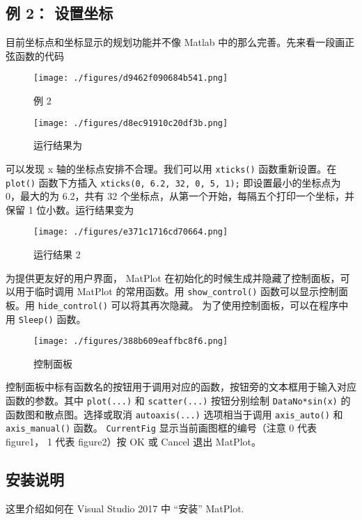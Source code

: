 \subsection{例 2： 设置坐标}

目前坐标点和坐标显示的规划功能并不像 Matlab 中的那么完善。先来看一段画正弦函数的代码

\begin{figure}[ht]
\centering
\texttt{[image: ./figures/d9462f090684b541.png]}
\caption{例 2} \label{fig_MtPlot_5}
\end{figure}

\begin{figure}[ht]
\centering
\texttt{[image: ./figures/d8ec91910c20df3b.png]}
\caption{运行结果为} \label{fig_MtPlot_6}
\end{figure}

可以发现 x 轴的坐标点安排不合理。我们可以用 \verb`xticks()` 函数重新设置。在 \verb`plot()` 函数下方插入
\verb`xticks(0, 6.2, 32, 0, 5, 1);`
即设置最小的坐标点为 0，最大的为 6.2，共有 32 个坐标点，从第一个开始，每隔五个打印一个坐标，并保留 1 位小数。运行结果变为

\begin{figure}[ht]
\centering
\texttt{[image: ./figures/e371c1716cd70664.png]}
\caption{运行结果 2} \label{fig_MtPlot_7}
\end{figure}

为提供更友好的用户界面， MatPlot 在初始化的时候生成并隐藏了控制面板，可以用于临时调用 MatPlot 的常用函数。用 \verb`show_control()` 函数可以显示控制面板。用 \verb`hide_control()` 可以将其再次隐藏。 为了使用控制面板，可以在程序中用 \verb`Sleep()` 函数。

\begin{figure}[ht]
\centering
\texttt{[image: ./figures/388b609eaffbc8f6.png]}
\caption{控制面板} \label{fig_MtPlot_8}
\end{figure}

控制面板中标有函数名的按钮用于调用对应的函数，按钮旁的文本框用于输入对应函数的参数。其中 \verb`plot(...)` 和 \verb`scatter(...)` 按钮分别绘制 \verb`DataNo*sin(x)` 的函数图和散点图。选择或取消 \verb`autoaxis(...)` 选项相当于调用 \verb`axis_auto()` 和 \verb`axis_manual()` 函数。 \verb`CurrentFig` 显示当前画图框的编号（注意 0 代表 figure1， 1 代表 figure2）按 OK 或 Cancel 退出 MatPlot。


\subsection{安装说明}
这里介绍如何在 Visual Studio 2017 中 “安装” MatPlot. 

